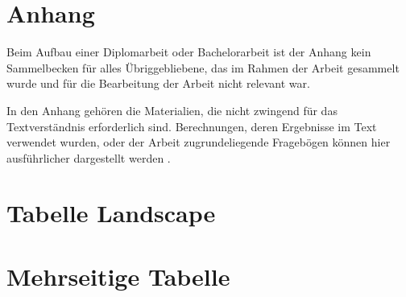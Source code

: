 \chapter{Anhang}
\label{app:A}

Beim Aufbau einer Diplomarbeit oder Bachelorarbeit ist der Anhang kein Sammelbecken für alles Übriggebliebene, das im Rahmen der Arbeit gesammelt wurde und für die Bearbeitung der Arbeit nicht relevant war.

In den Anhang gehören die Materialien, die nicht zwingend für das Textverständnis erforderlich sind. Berechnungen, deren Ergebnisse im Text verwendet wurden, oder der Arbeit zugrundeliegende Fragebögen können hier ausführlicher dargestellt werden .

\chapter{Tabelle Landscape}\label{app:tabelle-landscape}



\chapter{Mehrseitige Tabelle}\label{app:mehrsteige-tabelle}

